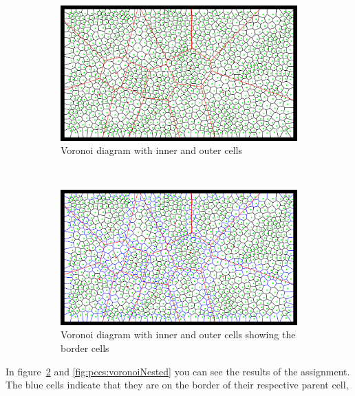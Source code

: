 \documentclass[11pt,a4paper,twocolumn]{article}
\begin{document}
\begin{figure}[ht]
	\centering
	\begin{subfigure}[b]{0.5\textwidth}
	\centering
	\includegraphics[width=\textwidth]{images/voronoiwchild.png}
	\caption{Voronoi diagram with inner and outer cells} \label{fig:pccs:voronoiwchild}
	\end{subfigure}
	~
	\begin{subfigure}[b]{0.5\textwidth}
	\centering
	\includegraphics[width=\textwidth]{images/voronoiwchildborder.png}
	\caption{Voronoi diagram with inner and outer cells showing the border cells} \label{fig:pccs:voronoiwchildborders}
	\end{subfigure}
	\caption{ }\label{fig:children}
\end{figure}
In figure~\ref{fig:pccs:voronoiwchildborders} and \ref{fig:pccs:voronoiNested} you can see the results of the assignment. The blue cells indicate that they are on the border of their respective parent cell, 
\end{document}
